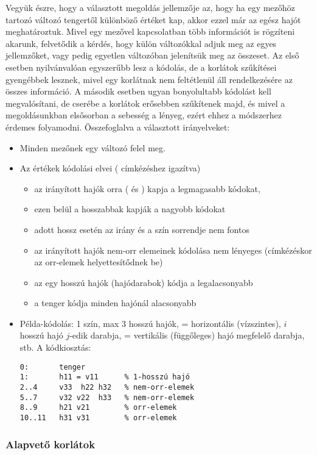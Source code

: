Vegyük észre, hogy a választott megoldás jellemzője az, hogy ha egy mezőhöz tartozó
változó tengertől különböző értéket kap, akkor ezzel már az egész hajót meghatároztuk.
\br
Mivel egy mezővel kapcsolatban több információt is rögzíteni akarunk, felvetődik a kérdés,
hogy külön változókkal adjuk meg az egyes jellemzőket, vagy pedig egyetlen változóban
jelenítsük meg az összeset. Az első esetben nyilvánvalóan egyszerűbb lesz a kódolás,
de a korlátok szűkítései gyengébbek lesznek, mivel egy korlátnak nem feltétlenül
áll rendelkezésére az összes információ. A második esetben ugyan bonyolultabb kódolást
kell megvalósítani, de cserébe a korlátok erősebben szűkítenek majd, és mivel a
megoldásunkban elsősorban a sebesség a lényeg, ezért ehhez a módszerhez érdemes folyamodni.
\br
Összefoglalva a választott irányelveket:

\begin{itemize}
\item Minden mezőnek egy változó felel meg.
\item Az értékek kódolási elvei ( címkézéshez igazítva)
\begin{itemize}
\item az irányított hajók orra ( és ) kapja a legmagasabb
kódokat,
\item ezen belül a hosszabbak kapják a nagyobb kódokat
\item adott hossz esetén az irány és a szín sorrendje nem fontos
\item az irányított hajók nem-orr elemeinek kódolása nem lényeges (címkézéskor
az orr-elemek helyettesítődnek be)
\item az egy hosszú hajók (hajódarabok) kódja a legalacsonyabb
\item a tenger kódja minden hajónál alacsonyabb
\end{itemize}
\item Példa-kódolás: 1 szín, max 3 hosszú hajók,  = horizontális (vízszintes),
$i$ hosszú hajó $j$-edik darabja,  = vertikális (függőleges) hajó megfelelő
darabja, stb. A kódkiosztás: 

\begin{verbatim}
0:       tenger
1:       h11 = v11      % 1-hosszú hajó
2..4     v33  h22 h32   % nem-orr-elemek
5..7     v32 v22  h33   % nem-orr-elemek
8..9     h21 v21        % orr-elemek
10..11   h31 v31        % orr-elemek
\end{verbatim}
\end{itemize}

\subsubsection{Alapvető korlátok}

